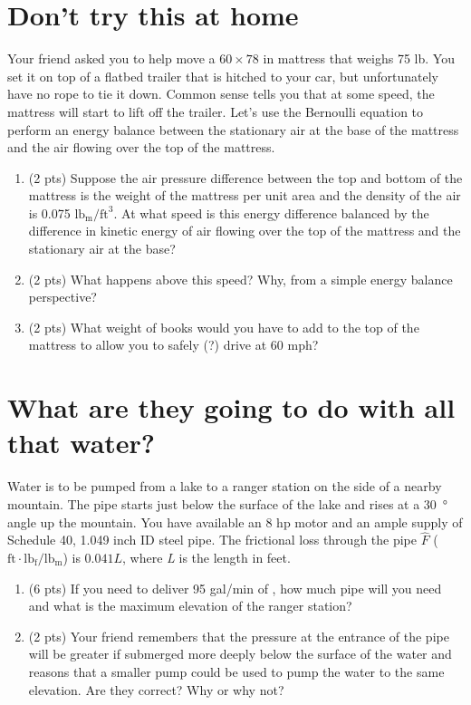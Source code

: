 \documentclass[11pt]{article}
\begin{document}
\section{Don't try this at home}
\label{sec-4}
Your friend asked you to help move a \(60 \times 78\) in mattress that weighs 75 lb.  You set it on top of a flatbed trailer that is hitched to your car, but unfortunately have no rope to tie it down.  Common sense tells you that at some speed, the mattress will start to lift off the trailer.  Let's use the Bernoulli equation to perform an energy balance between the stationary air at the base of the mattress and the air flowing over the top of the mattress.
\begin{enumerate}
\item (2 pts) Suppose the air pressure difference between the top and bottom of the mattress is the weight of the mattress per unit area and the density of the air is 0.075 \(\text{lb}_\text{m}/\text{ft}^{3}\). At what speed is this energy difference balanced by the difference in kinetic energy of air flowing over the top of the mattress and the stationary air at the base?
\item (2 pts) What happens above this speed?  Why, from a simple energy balance perspective?
\item (2 pts) What weight of books would you have to add to the top of the mattress to allow you to safely (?) drive at 60 mph?
\end{enumerate}


\section{What are they going to do with all that water?}
\label{sec-5}
Water is to be pumped from a lake to a ranger station on the side of a nearby mountain. The pipe starts just below the surface of the lake and rises at a \SI{30}{\degree} angle up the mountain. You have available an 8 hp motor and an ample supply of Schedule 40, 1.049 inch ID steel pipe. The frictional loss through the pipe \(\hat{F}\) (\(\text{ft}\cdot\text{lb}_\text{f}/\text{lb}_\text{m}\)) is \(0.041 L\), where \emph{L} is the length in feet.

\begin{enumerate}
\item (6 pts) If you need to deliver 95 gal/min of , how much pipe will you need and what is the maximum elevation of the ranger station?
\item (2 pts) Your friend remembers that the pressure at the entrance of the pipe will be greater if submerged more deeply below the surface of the water and reasons that a smaller pump could be used to pump the water to the same elevation.  Are they correct?  Why or why not?
\end{enumerate}
\end{document}
